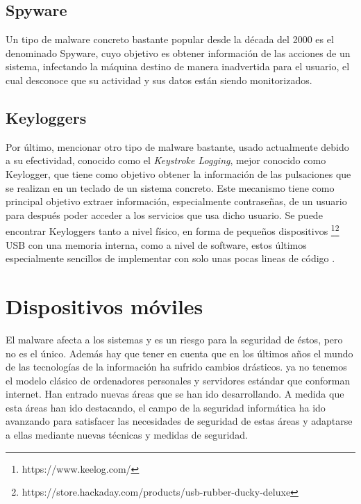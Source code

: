 \subsection{Spyware}

Un tipo de malware concreto bastante popular desde la década del 2000 es el denominado Spyware, cuyo objetivo es obtener información de las acciones de un sistema, infectando la máquina destino de manera inadvertida para el usuario, el cual desconoce que su actividad y sus datos están siendo monitorizados.

\subsection{Keyloggers}

Por último, mencionar otro tipo de malware bastante, usado actualmente debido a su efectividad, conocido  como el \textit{Keystroke Logging}, mejor conocido como Keylogger, que tiene como objetivo obtener la información de las pulsaciones que se realizan en un teclado de un sistema concreto. Este mecanismo tiene como principal objetivo extraer información, especialmente contraseñas, de un usuario para después poder acceder a los servicios que usa dicho usuario. Se puede encontrar Keyloggers tanto a nivel físico, en forma de pequeños dispositivos \footnote{https://www.keelog.com/}\footnote{https://store.hackaday.com/products/usb-rubber-ducky-deluxe} USB con una memoria interna, como a nivel de software, estos últimos especialmente sencillos de implementar con solo unas pocas lineas de código \cite{ander-keylogger}.


\section{Dispositivos móviles}

El malware afecta a los sistemas y es un riesgo para la seguridad de éstos, pero no es el único. Además hay que tener en cuenta que en los últimos años el mundo de las tecnologías de la información ha sufrido cambios drásticos. ya no tenemos el modelo clásico de ordenadores personales y servidores estándar que conforman internet. Han entrado nuevas áreas que se han ido desarrollando. A medida que esta áreas han ido destacando, el campo de la seguridad informática ha ido avanzando para satisfacer las necesidades de seguridad de estas áreas y adaptarse a ellas mediante nuevas técnicas y medidas de seguridad.

